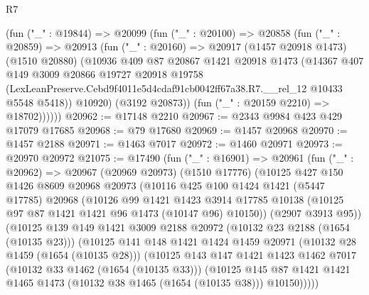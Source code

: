 \begin{lexlean}{R7}
\begin{coremodule}
        (fun ("_" : @19844) =>
        @20099
          (fun ("_" : @20100) =>
          @20858
            (fun ("_" : @20859) =>
            @20913
              (fun ("_" : @20160) =>
              @20917
                (@1457 @20918 @1473)
                (@1510 @20880)
                (@10936
                  @409
                  @87
                  @20867
                  @1421
                  @20918
                  @1473
                  (@14367
                    @407
                    @149
                    @3009
                    @20866
                    @19727
                    @20918
                    @19758
                    (LexLeanPreserve.Cebd9f4011e5d4cdaf91cb0042ff67a38.R7.__rel_12
                      @10433
                      @5548
                      @5418))
                  @10920)
                (@3192 @20873))
              (fun ("_" : @20159 @2210) => @18702))))))
@20962 := @17148 @2210
@20967 := @2343 @9984 @423 @429 @17079 @17685
@20968 := @79 @17680
@20969 := @1457 @20968
@20970 := @1457 @2188
@20971 := @1463 @7017
@20972 := @1460 @20971
@20973 := @20970 @20972
@21075 := @17490
    (fun ("_" : @16901) =>
    @20961
      (fun ("_" : @20962) =>
      @20967
        (@20969 @20973)
        (@1510 @17776)
        (@10125
          @427
          @150
          @1426
          @8609
          @20968
          @20973
          (@10116
            @425
            @100
            @1424
            @1421
            (@5447 @17785)
            @20968
            (@10126
              @99
              @1421
              @1423
              @3914
              @17785
              @10138
              (@10125 @97 @87 @1421 @1421 @96 @1473 (@10147 @96) @10150))
            (@2907 @3913 @95))
          (@10125
            @139
            @149
            @1421
            @3009
            @2188
            @20972
            (@10132 @23 @2188 (@1654 (@10135 @23)))
            (@10125
              @141
              @148
              @1421
              @1424
              @1459
              @20971
              (@10132 @28 @1459 (@1654 (@10135 @28)))
              (@10125
                @143
                @147
                @1421
                @1423
                @1462
                @7017
                (@10132 @33 @1462 (@1654 (@10135 @33)))
                (@10125
                  @145
                  @87
                  @1421
                  @1421
                  @1465
                  @1473
                  (@10132 @38 @1465 (@1654 (@10135 @38)))
                  @10150)))))

\end{coremodule}
\end{lexlean}
